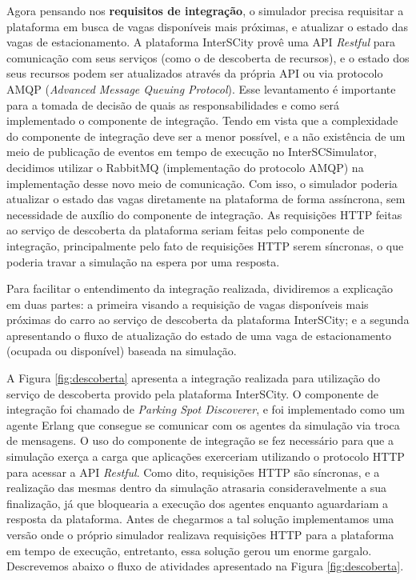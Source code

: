 Agora pensando nos \textbf{requisitos de integração}, o simulador precisa requisitar a plataforma em busca de vagas disponíveis mais próximas, e atualizar o estado
das vagas de estacionamento.
A plataforma InterSCity provê uma API \textit{Restful} para comunicação com seus serviços (como o de descoberta de recursos), e o estado dos seus recursos podem ser
atualizados através da própria API ou via protocolo AMQP (\textit{Advanced Message Queuing Protocol}).
Esse levantamento é importante para a tomada de decisão de quais as responsabilidades e como será implementado o componente de integração.
Tendo em vista que a complexidade do componente de integração deve ser a menor possível, e a não existência de um meio de publicação de eventos em tempo de execução
no InterSCSimulator, decidimos utilizar o RabbitMQ (implementação do protocolo AMQP) na implementação desse novo meio de comunicação.
Com isso, o simulador poderia atualizar o estado das vagas diretamente na plataforma de forma assíncrona, sem necessidade de auxílio do componente de integração.
As requisições HTTP feitas ao serviço de descoberta da plataforma seriam feitas pelo componente de integração, principalmente pelo fato de requisições HTTP serem
síncronas, o que poderia travar a simulação na espera por uma resposta.

Para facilitar o entendimento da integração realizada, dividiremos a explicação em duas partes: a primeira visando a requisição de vagas disponíveis mais próximas
do carro ao serviço de descoberta da plataforma InterSCity; e a segunda apresentando o fluxo de atualização do estado de uma vaga de estacionamento (ocupada
ou disponível) baseada na simulação.

A Figura \ref{fig:descoberta} apresenta a integração realizada para utilização do serviço de descoberta provido pela plataforma InterSCity.
O componente de integração foi chamado de \textit{Parking Spot Discoverer}, e foi implementado como um agente Erlang que consegue se comunicar com os agentes da
simulação via troca de mensagens.
O uso do componente de integração se fez necessário para que a simulação exerça a carga que aplicações exerceriam utilizando o protocolo HTTP para acessar
a API \textit{Restful}.
Como dito, requisições HTTP são síncronas, e a realização das mesmas dentro da simulação atrasaria consideravelmente a sua finalização, já que bloquearia a
execução dos agentes enquanto aguardariam a resposta da plataforma.
Antes de chegarmos a tal solução implementamos uma versão onde o próprio simulador realizava requisições HTTP para a plataforma em tempo de execução, entretanto,
essa solução gerou um enorme gargalo.
Descrevemos abaixo o fluxo de atividades apresentado na Figura \ref{fig:descoberta}.

